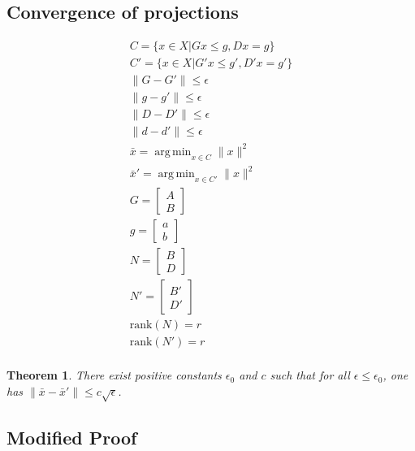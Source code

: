 \documentclass{article}
\newtheorem{theorem}{Theorem}[section]
\theoremstyle{case}
\DeclareMathOperator*{\argmin}{arg\,min}
\newcommand{\xo}{{{\bar x}}}
\begin{document}
\subsection{Convergence of projections}

\color{red}


\begin{align*}
C = \{ x \in X | Gx\le g, Dx = g \} \\
C' = \{ x \in X | G'x\le g', D'x = g' \} \\
\|G - G'\| \le \epsilon \\
\|g - g'\| \le \epsilon \\
\|D - D'\| \le \epsilon \\
\|d - d'\| \le \epsilon \\
\xo = \argmin_{x\in C}\|x\|^2 \\
\xo' = \argmin_{x\in C'}\|x\|^2 \\
G = \begin{bmatrix}A \\ B\end{bmatrix} \\
g = \begin{bmatrix}a \\ b\end{bmatrix} \\
N = \begin{bmatrix}B \\ D\end{bmatrix}\\
N' = \begin{bmatrix}B' \\ D'\end{bmatrix}\\
\text{rank}(N) = r \\
\text{rank}(N') = r \\
\end{align*}



\begin{theorem}
There exist positive constants $\epsilon_0$ and $c$ such that for all $\epsilon \le \epsilon_0$,  one has $\|\xo - \xo'\| \le c \sqrt{\epsilon}$.
\end{theorem}



\color{black}



\subsection{Modified Proof}
\end{document}
